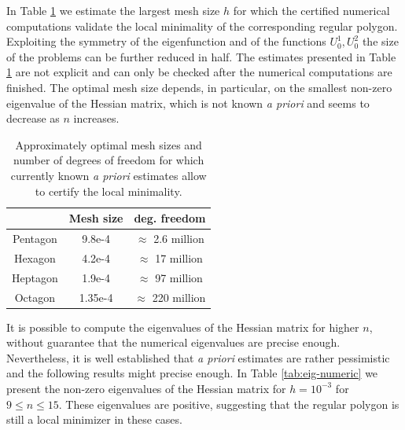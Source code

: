 \documentclass[11pt]{article}
\newcommand{\smaller}{\small}
\numberwithin{equation}{section}\newtheorem*{jepEnonce}{\jepEnonceTitle}\newenvironment{enonce*}[1]{\def\jepEnonceTitle{#1}\jepEnonce}{\endjepEnonce}\newtheorem*{conj*}{Conjecture}
\theoremstyle{plain}
\theoremstyle{definition}
\begin{document}
In Table \ref{table:optimal-size-comp} we estimate the largest mesh size $h$ for which the certified numerical computations validate the local minimality of the corresponding regular polygon. Exploiting the symmetry of the eigenfunction and of the functions $U_0^1, U_0^2$ the size of the problems can be further reduced in half. The estimates presented in Table \ref{table:optimal-size-comp} are not explicit and can only be checked after the numerical computations are finished. The optimal mesh size depends, in particular, on the smallest non-zero eigenvalue of the Hessian matrix, which is not known \emph{a priori} and seems to decrease as $n$ increases.

\begin{table}[htb]
\smaller
\caption{Approximately optimal mesh sizes and number of degrees of freedom for which currently known {\it a priori} estimates allow to certify the local minimality.}
\label{table:optimal-size-comp}
\begin{tabular}{|c|c|c|}
\hline
& Mesh size & deg. freedom \\ \hline
Pentagon & 9.8e-4 & $\approx$ 2.6 million\\ \hline
Hexagon & 4.2e-4 & $\approx$ 17 million\\ \hline
Heptagon & 1.9e-4 & $\approx$ 97 million\\ \hline
Octagon & 1.35e-4 & $\approx$ 220 million\\ \hline
\end{tabular}
\end{table}

It is possible to compute the eigenvalues of the Hessian matrix for higher $n$, without guarantee that the numerical eigenvalues are precise enough. Nevertheless, it is well established that \emph{a priori} estimates are rather pessimistic and the following results might precise enough. In Table \ref{tab:eig-numeric} we present the non-zero eigenvalues of the Hessian matrix for $h=10^{-3}$ for $9\leq n \leq 15$. These eigenvalues are positive, suggesting that the regular polygon is still a local minimizer in these cases.
\end{document}
